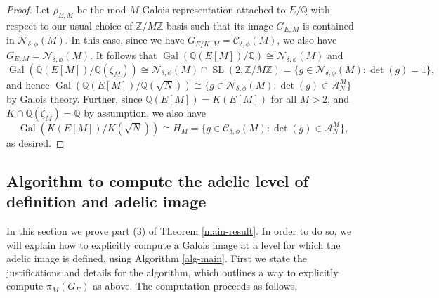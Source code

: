 \documentclass[11pt]{amsart}
\theoremstyle{definition}
\newcommand{\Q}{\mathbb{Q}}
\newcommand{\Z}{\mathbb{Z}}
\newcommand{\SL}{\operatorname{SL}}
\newcommand{\Gal}{\operatorname{Gal}}
\begin{document}
\begin{proof}
    Let $\rho_{E,M}$ be the mod-$M$ Galois representation attached to $E/\Q$ with respect to our usual choice of $\Z/M\Z$-basis such that its image $G_{E, M}$ is contained in $\mathcal{N}_{\delta, \phi}(M)$. In this case, since we have $G_{E/K, M} = \mathcal{C}_{\delta, \phi}(M)$, we also have $G_{E,M} = \mathcal{N}_{\delta, \phi}(M)$. It follows that $\Gal(\Q(E[M])/\Q) \cong \mathcal{N}_{\delta, \phi}(M)$ and \[ \Gal(\Q(E[M])/\Q(\zeta_M)) \cong \mathcal{N}_{\delta, \phi}(M) \cap \SL(2, \Z/M\Z) = \{ g \in \mathcal{N}_{\delta, \phi}(M) : \det(g) = 1 \}, \] 
    and hence $\Gal(\Q(E[M])/\Q(\sqrt{N})) \cong  \{ g \in \mathcal{N}_{\delta, \phi}(M) : \det(g) \in \mathcal{A}_{N}^{M}  \}$ by Galois theory. Further, since $\Q(E[M]) = K(E[M])$ for all $M>2$, and $K \cap \Q(\zeta_M) = \Q$ by assumption, we also have 
    \[ \Gal(K(E[M])/K(\sqrt{N})) \cong H_M = \{ g \in \mathcal{C}_{\delta, \phi}(M) : \det(g) \in \mathcal{A}_{N}^{M}  \}, \]
    as desired.
\end{proof}


\subsection{Algorithm to compute the adelic level of definition and adelic image}\label{subsec-alg-main} In this section we prove part (3) of Theorem \ref{main-result}. In order to do so, we will explain how to explicitly compute a Galois image at a level for which the adelic image is defined, using Algorithm \ref{alg-main}. First we state the justifications and details for the algorithm, which outlines a way to explicitly compute $\pi_{M}(G_E)$ as above. The computation proceeds as follows.
\end{document}
